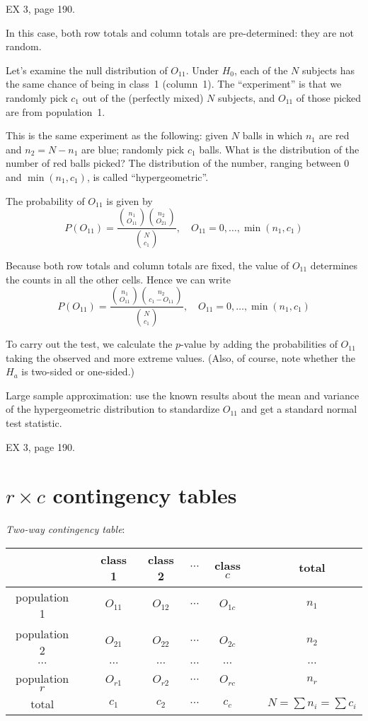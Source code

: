 \documentclass[12pt]{article}
\begin{document}
\example EX 3, page 190.

In this case, both row totals and column totals are pre-determined:
they are not random.

Let's examine the null distribution of $O_{11}$.
Under $H_0$,
each of the $N$ subjects has the same chance of being in class~1
(column~1).
The ``experiment'' is that we randomly pick $c_1$ out of the
(perfectly mixed) $N$ subjects, and $O_{11}$ of those picked
are from population~1.

This is the same experiment as the following:
given $N$ balls in which $n_1$ are red and $n_2 = N - n_1$ are blue;
randomly pick $c_1$ balls.
What is the distribution of the number of red balls picked?
The distribution of the number, ranging between 0 and $\min(n_1, c_1)$,
is called ``hypergeometric''.

The probability of $O_{11}$ is given by
\[
P(O_{11})
= \frac{{n_1\choose O_{11}}{n_2\choose O_{21}}}
    {{N\choose c_1}}
,\quad
O_{11} = 0,\dotsc, \min(n_1, c_1)
\]

Because both row totals and column totals are fixed,
the value of $O_{11}$ determines the counts in all the other cells.
Hence we can write
\[
P(O_{11})
= \frac{{n_1\choose O_{11}}{n_2\choose c_1 - O_{11}}}
    {{N\choose c_1}}
,\quad
O_{11} = 0,\dotsc, \min(n_1, c_1)
\]

To carry out the test,
we calculate the $p$-value by adding the probabilities
of $O_{11}$ taking the observed and more extreme values.
(Also, of course, note whether the $H_a$ is two-sided or one-sided.)

Large sample approximation:
use the known results about the mean and variance of the hypergeometric
distribution to standardize $O_{11}$ and get a standard normal test
statistic.

\example EX 3, page 190.

\section{$r\times c$ contingency tables}

\emph{Two-way contingency table}:

\begin{center}
\begin{tabular}{cc|cccc|cc}
                && class 1  & class 2   & $\cdots$  & class $c$ && total\\ \hline
population 1    && $O_{11}$ & $O_{12}$  & $\cdots$  & $O_{1c}$  && $n_1$\\
population 2    && $O_{21}$ & $O_{22}$  & $\cdots$  & $O_{2c}$  && $n_2$\\ \hline
$\cdots$        && $\cdots$ & $\cdots$  & $\cdots$  & $\cdots$  && $\cdots$ \\ \hline
population $r$  && $O_{r1}$ & $O_{r2}$  & $\cdots$  & $O_{rc}$  && $n_r$\\ \hline
total           && $c_1$    & $c_2$     & $\cdots$  & $c_c$     && $N = \sum n_i = \sum c_i$
\end{tabular}
\end{center}
\end{document}
